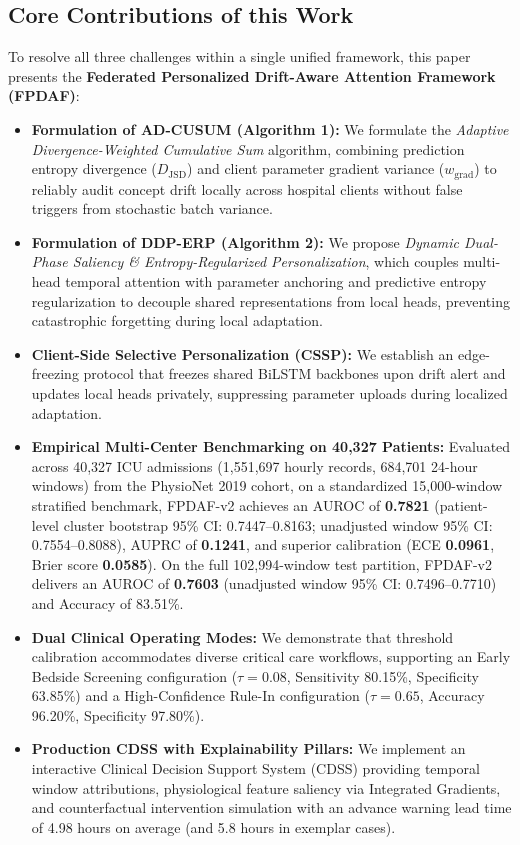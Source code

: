 \documentclass[journal,twocolumn,10pt]{IEEEtran}
\begin{document}
\subsection{Core Contributions of this Work}
To resolve all three challenges within a single unified framework, this paper presents the \textbf{Federated Personalized Drift-Aware Attention Framework (FPDAF)}:
\begin{itemize}
    \item \textbf{Formulation of AD-CUSUM (Algorithm 1):} We formulate the \textit{Adaptive Divergence-Weighted Cumulative Sum} algorithm, combining prediction entropy divergence ($D_{\text{JSD}}$) and client parameter gradient variance ($w_{\text{grad}}$) to reliably audit concept drift locally across hospital clients without false triggers from stochastic batch variance.
    \item \textbf{Formulation of DDP-ERP (Algorithm 2):} We propose \textit{Dynamic Dual-Phase Saliency \& Entropy-Regularized Personalization}, which couples multi-head temporal attention with parameter anchoring and predictive entropy regularization to decouple shared representations from local heads, preventing catastrophic forgetting during local adaptation.
    \item \textbf{Client-Side Selective Personalization (CSSP):} We establish an edge-freezing protocol that freezes shared BiLSTM backbones upon drift alert and updates local heads privately, suppressing parameter uploads during localized adaptation.
    \item \textbf{Empirical Multi-Center Benchmarking on 40,327 Patients:} Evaluated across 40,327 ICU admissions (1,551,697 hourly records, 684,701 24-hour windows) from the PhysioNet 2019 cohort, on a standardized 15,000-window stratified benchmark, FPDAF-v2 achieves an AUROC of \textbf{0.7821} (patient-level cluster bootstrap 95\% CI: 0.7447--0.8163; unadjusted window 95\% CI: 0.7554--0.8088), AUPRC of \textbf{0.1241}, and superior calibration (ECE \textbf{0.0961}, Brier score \textbf{0.0585}). On the full 102,994-window test partition, FPDAF-v2 delivers an AUROC of \textbf{0.7603} (unadjusted window 95\% CI: 0.7496--0.7710) and Accuracy of 83.51\%.
    \item \textbf{Dual Clinical Operating Modes:} We demonstrate that threshold calibration accommodates diverse critical care workflows, supporting an Early Bedside Screening configuration ($\tau=0.08$, Sensitivity 80.15\%, Specificity 63.85\%) and a High-Confidence Rule-In configuration ($\tau=0.65$, Accuracy 96.20\%, Specificity 97.80\%).
    \item \textbf{Production CDSS with Explainability Pillars:} We implement an interactive Clinical Decision Support System (CDSS) providing temporal window attributions, physiological feature saliency via Integrated Gradients, and counterfactual intervention simulation with an advance warning lead time of 4.98 hours on average (and 5.8 hours in exemplar cases).
\end{itemize}
\end{document}
